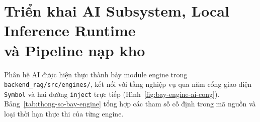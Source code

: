 \section[Triển khai AI Subsystem, Local Inference Runtime và Pipeline nạp kho]{Triển khai AI Subsystem, Local Inference Runtime\\và Pipeline nạp kho}
\label{sec:trien-khai-ai-subsystem}

Phân hệ AI được hiện thực thành bảy module engine trong \texttt{backend\_\allowbreak{}rag/\allowbreak{}src/\allowbreak{}engines/}, kết nối với tầng nghiệp vụ qua năm cổng giao diện \texttt{Symbol} và hai đường \texttt{inject} trực tiếp (Hình~\ref{fig:bay-engine-ai-cong}). Bảng~\ref{tab:thong-so-bay-engine} tổng hợp các tham số cố định trong mã nguồn và loại thời hạn thực thi của từng engine.

